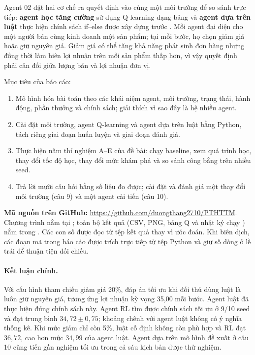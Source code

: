 \documentclass[12pt,a4paper]{report}
\begin{document}
Agent 02 đặt hai cơ chế ra quyết định vào cùng một môi trường để so sánh trực tiếp:
\textbf{agent học tăng cường} sử dụng Q-learning dạng bảng và \textbf{agent dựa trên
luật} thực hiện chính sách if--else được xây dựng trước
\cite{assignment,complementary}. Mỗi agent đại diện cho một người bán cùng kinh doanh
một sản phẩm; tại mỗi bước, họ chọn giảm giá hoặc giữ nguyên giá. Giảm giá có thể tăng
khả năng phát sinh đơn hàng nhưng đồng thời làm biên lợi nhuận trên mỗi sản phẩm thấp
hơn, vì vậy quyết định phải cân đối giữa lượng bán và lợi nhuận đơn vị.

Mục tiêu của báo cáo:
\begin{enumerate}
\item Mô hình hóa bài toán theo các khái niệm agent, môi trường, trạng thái, hành
  động, phần thưởng và chính sách; giải thích vì sao đây là hệ nhiều agent.
\item Cài đặt môi trường, agent Q-learning và agent dựa trên luật bằng Python, tách
  riêng giai đoạn huấn luyện và giai đoạn đánh giá.
\item Thực hiện năm thí nghiệm A--E của đề bài: chạy baseline, xem quá trình học,
  thay đổi tốc độ học, thay đổi mức khám phá và so sánh công bằng trên nhiều seed.
\item Trả lời mười câu hỏi bằng số liệu đo được; cài đặt và đánh giá một thay đổi
  môi trường (câu 9) và một agent cải tiến (câu 10).
\end{enumerate}

\noindent\textbf{Mã nguồn trên GitHub:} \url{https://github.com/duongthang2710/PTHTTM}.
Chương trình nằm tại ; toàn bộ kết quả
(CSV, PNG, bảng Q và nhật ký chạy ) nằm trong
. Các con số được đọc từ tệp kết quả thay vì ước đoán.
Khi biên dịch, các đoạn mã trong báo cáo được trích trực tiếp từ tệp Python và giữ số
dòng ở lề trái để thuận tiện đối chiếu.

\paragraph{Kết luận chính.} Với cấu hình tham chiếu giảm giá 20\%, đáp án tối ưu khi
đối thủ dùng luật là luôn giữ nguyên giá, tương ứng lợi nhuận kỳ vọng 35{,}00 mỗi bước.
Agent luật đã thực hiện đúng chính sách này. Agent RL tìm được chính sách tối ưu ở 9/10
seed và đạt trung bình $34{,}72\pm0{,}75$; khoảng chênh với agent luật không có ý nghĩa
thống kê. Khi mức giảm chỉ còn 5\%, luật cố định không còn phù hợp và RL đạt $36{,}72$,
cao hơn mức $34{,}99$ của agent luật. Agent dựa trên mô hình đề xuất ở câu 10 cũng tiến
gần nghiệm tối ưu trong cả sáu kịch bản được thử nghiệm.
\end{document}
